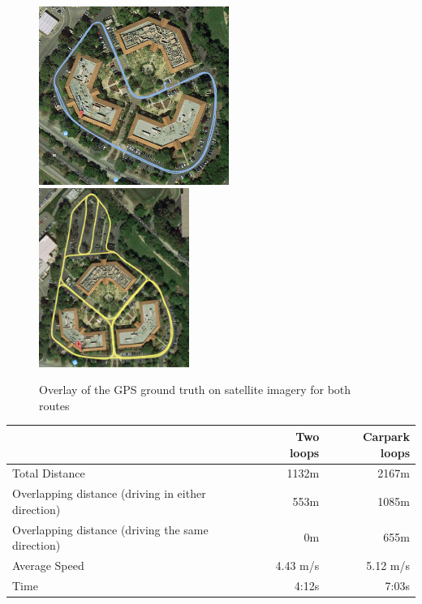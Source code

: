 \begin{figure}[h]
  \centering
    \includegraphics[width=0.553\textwidth]{chapters/images/two_loops_overlay}
    \includegraphics[width=0.437\textwidth]{chapters/images/carpark_loops_overlay}
  \caption{Overlay of the GPS ground truth on satellite imagery for both routes}
\end{figure}

\begin{table}[h]
    \begin{tabular}{ p{8.5cm} r r} %
    \toprule
    & Two loops & Carpark loops \\
    \midrule
    Total Distance & 1132m & 2167m \\
    Overlapping distance (driving in either direction)& 553m & 1085m \\
    Overlapping distance (driving the same direction)& 0m & 655m \\
    Average Speed & 4.43 m/s & 5.12 m/s \\
    Time & 4:12s & 7:03s \\
    \bottomrule
    \end{tabular}
  \label{tab:distances}
\end{table}

